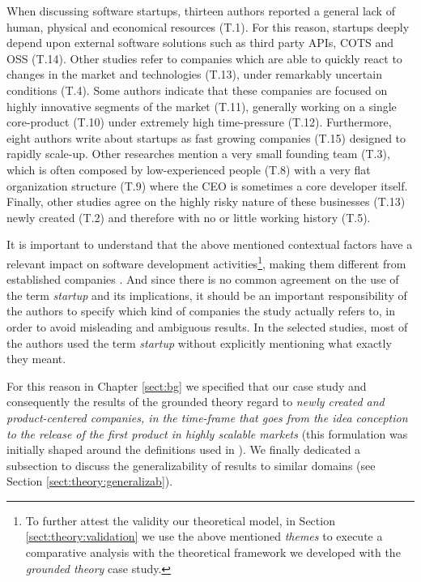 \documentclass[final,5p,times,twocolumn]{elsarticle}
\begin{document}
When discussing software startups, thirteen authors reported a general lack of human, physical and economical resources (T.1). For this reason, startups deeply depend upon external software solutions such as third party APIs, COTS and OSS (T.14). Other studies refer to  companies which are able to quickly react to changes in the market and technologies (T.13), under remarkably uncertain conditions (T.4). Some authors indicate that these companies are focused on highly innovative segments of the market (T.11), generally working on a single core-product (T.10) under extremely high time-pressure (T.12). Furthermore, eight authors write about startups as fast growing companies (T.15) designed to rapidly scale-up. Other researches mention a very small founding team (T.3), which is often composed by low-experienced people (T.8) with a very flat organization structure (T.9) where the CEO is sometimes a core developer itself. Finally, other studies agree on the highly risky nature of these businesses (T.13) newly created (T.2) and therefore with no or little working history (T.5).

It is important to understand that the above mentioned contextual factors have a relevant impact on software development activities\footnote{To further attest the validity our theoretical model, in Section \ref{sect:theory:validation} we use the above mentioned \textit{themes} to execute a comparative analysis with the theoretical framework we developed with the \textit{grounded theory} case study.}, making them different from established companies \cite{Sutton2000}. And since there is no common agreement on the use of the term \textit{startup} and its implications, it should be an important responsibility of the authors to specify which kind of companies the study actually refers to, in order to avoid misleading and ambiguous results. In the selected studies, most of the authors used the term \textit{startup} without explicitly mentioning what exactly they meant.

For this reason in Chapter \ref{sect:bg} we specified that our case study and consequently the results of the grounded theory regard to \textit{newly created and product-centered companies, in the time-frame that goes from the idea conception to the release of the first product in highly scalable markets} (this formulation was initially shaped around the definitions used in \cite{Blank2012,  Ries2011, Marmer2011}). We finally dedicated a subsection to discuss the generalizability of results to similar domains (see  Section \ref{sect:theory:generalizab}).
\end{document}
